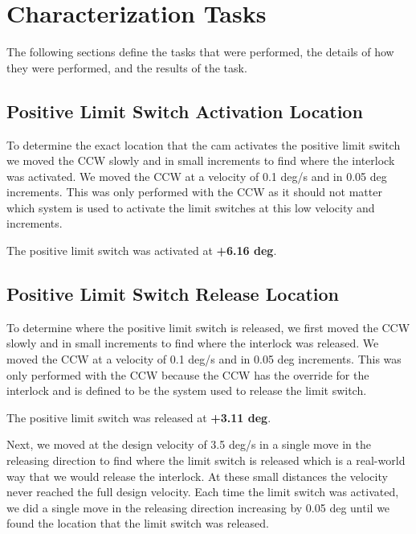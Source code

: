 \documentclass[SE,lsstdraft,authoryear,toc]{lsstdoc}
\begin{document}
\hypertarget{characterization-tasks}{%
\section{\texorpdfstring{Characterization Tasks
}{Characterization Tasks }}\label{characterization-tasks}}

The following sections define the tasks that were performed, the details
of how they were performed, and the results of the task.

\hypertarget{positive-limit-switch-activation-location}{%
\subsection{Positive Limit Switch Activation
Location}\label{positive-limit-switch-activation-location}}

To determine the exact location that the cam activates the positive
limit switch we moved the CCW slowly and in small increments to find
where the interlock was activated. We moved the CCW at a velocity of 0.1
deg/s and in 0.05 deg increments. This was only performed with the CCW
as it should not matter which system is used to activate the limit
switches at this low velocity and increments.

The positive limit switch was activated at \textbf{+6.16 deg}.

\hypertarget{positive-limit-switch-release-location}{%
\subsection{Positive Limit Switch Release
Location}\label{positive-limit-switch-release-location}}

To determine where the positive limit switch is released, we first moved
the CCW slowly and in small increments to find where the interlock was
released. We moved the CCW at a velocity of 0.1 deg/s and in 0.05 deg
increments. This was only performed with the CCW because the CCW has the
override for the interlock and is defined to be the system used to
release the limit switch.

The positive limit switch was released at \textbf{+3.11 deg}.

Next, we moved at the design velocity of 3.5 deg/s in a single move in
the releasing direction to find where the limit switch is released which
is a real-world way that we would release the interlock. At these small
distances the velocity never reached the full design velocity. Each time
the limit switch was activated, we did a single move in the releasing
direction increasing by 0.05 deg until we found the location that the
limit switch was released.
\end{document}
